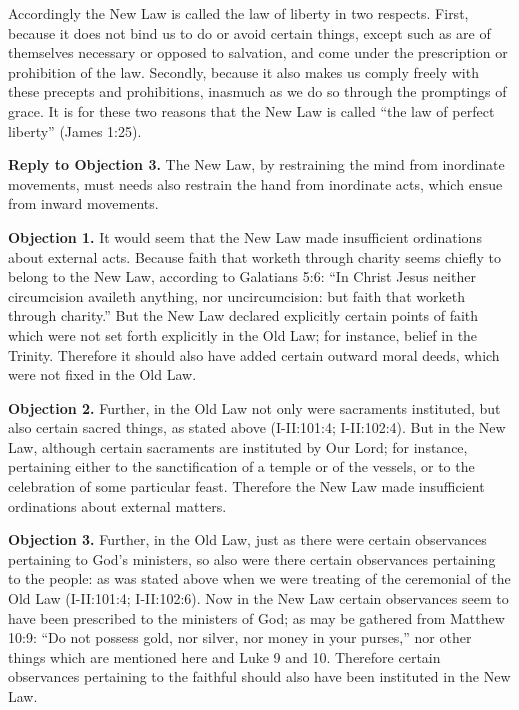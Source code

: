 Accordingly the New Law is called the law of liberty in two respects. First, because it does not bind us to do or avoid certain things, except such as are of themselves necessary or opposed to salvation, and come under the prescription or prohibition of the law. Secondly, because it also makes us comply freely with these precepts and prohibitions, inasmuch as we do so through the promptings of grace. It is for these two reasons that the New Law is called ``the law of perfect liberty'' (James 1:25).

\textbf{Reply to Objection 3.} The New Law, by restraining the mind from inordinate movements, must needs also restrain the hand from inordinate acts, which ensue from inward movements.


\textbf{Objection 1.} It would seem that the New Law made insufficient ordinations about external acts. Because faith that worketh through charity seems chiefly to belong to the New Law, according to Galatians 5:6: ``In Christ Jesus neither circumcision availeth anything, nor uncircumcision: but faith that worketh through charity.'' But the New Law declared explicitly certain points of faith which were not set forth explicitly in the Old Law; for instance, belief in the Trinity. Therefore it should also have added certain outward moral deeds, which were not fixed in the Old Law.

\textbf{Objection 2.} Further, in the Old Law not only were sacraments instituted, but also certain sacred things, as stated above (I-II:101:4; I-II:102:4). But in the New Law, although certain sacraments are instituted by Our Lord; for instance, pertaining either to the sanctification of a temple or of the vessels, or to the celebration of some particular feast. Therefore the New Law made insufficient ordinations about external matters.

\textbf{Objection 3.} Further, in the Old Law, just as there were certain observances pertaining to God's ministers, so also were there certain observances pertaining to the people: as was stated above when we were treating of the ceremonial of the Old Law (I-II:101:4; I-II:102:6). Now in the New Law certain observances seem to have been prescribed to the ministers of God; as may be gathered from Matthew 10:9: ``Do not possess gold, nor silver, nor money in your purses,'' nor other things which are mentioned here and Luke 9 and 10. Therefore certain observances pertaining to the faithful should also have been instituted in the New Law.

